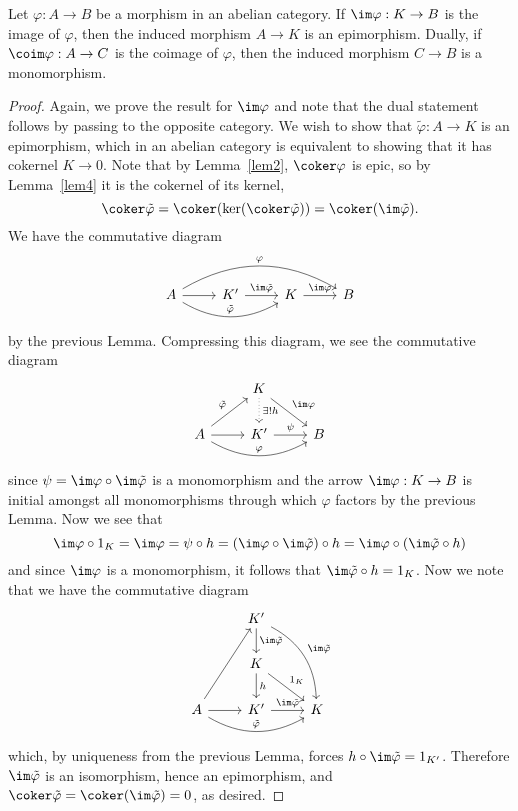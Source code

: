 \documentclass[10pt]{amsart}
\begin{document}
\begin{lem}\label{lem8}
  Let $\varphi : A \rightarrow B$ be a morphism in an abelian category.
  If $\im\varphi : K \rightarrow B$ is the image of $\varphi$, then the induced morphism $A \rightarrow K$ is an epimorphism.
  Dually, if $\coim\varphi : A \rightarrow C$ is the coimage of $\varphi$, then the induced morphism $C \rightarrow B$ is a monomorphism.

  \begin{proof}
    Again, we prove the result for $\im\varphi$ and note that the dual statement follows by passing to the opposite category.
    We wish to show that $\tilde{\varphi} : A \rightarrow K$ is an epimorphism, which in an abelian category is equivalent to showing that it has cokernel $K \rightarrow 0$.
    Note that by Lemma~\ref{lem2}, $\coker\varphi$ is epic, so by Lemma~\ref{lem4} it is the cokernel of its kernel,
    $$\coker\tilde{\varphi} = \coker(\ker(\coker\tilde{\varphi})) = \coker(\im\tilde{\varphi}).$$
    We have the commutative diagram 
    $$\begin{tikzcd}
      A \arrow[bend right]{rr}{\tilde{\varphi}} \arrow[bend left]{rrr}{\varphi}\arrow{r} & K^\prime \arrow{r}{\im\tilde{\varphi}}& K \arrow{r}{\im\varphi}& B
    \end{tikzcd}$$
    by the previous Lemma.
    Compressing this diagram, we see the commutative diagram
    $$\begin{tikzcd}
      & K \arrow{rd}{\im\varphi} \arrow[dotted]{d}{\exists !h}&\\
      A \arrow[bend right]{rr}{\varphi} \arrow{r} \arrow{ru}{\tilde{\varphi}} & K^\prime \arrow{r}{\psi}& B
    \end{tikzcd}$$
    since $\psi = \im\varphi \circ \im\tilde{\varphi}$ is a monomorphism and the arrow $\im\varphi : K \rightarrow B$ is initial amongst all monomorphisms through which $\varphi$ factors by the previous Lemma.
    Now we see that 
    $$\im\varphi \circ 1_K = \im\varphi = \psi \circ h = (\im\varphi \circ \im\tilde{\varphi}) \circ h = \im\varphi \circ (\im\tilde{\varphi} \circ h)$$
    and since $\im\varphi$ is a monomorphism, it follows that $\im\tilde{\varphi} \circ h = 1_K$.
    Now we note that we have the commutative diagram
    $$\begin{tikzcd}
      & K^\prime \arrow{d}{\im\tilde{\varphi}} \arrow[bend left]{rdd}{\im\tilde{\varphi}}&\\
      & K \arrow{d}{h} \arrow{rd}{1_K}& \\
      A \arrow{ruu}\arrow{r}\arrow[bend right]{rr}{\tilde{\varphi}} & K^\prime \arrow{r}{\im\tilde{\varphi}}& K
    \end{tikzcd}$$
    which, by uniqueness from the previous Lemma, forces $h \circ \im\tilde{\varphi} = 1_{K^\prime}$.
    Therefore $\im\tilde{\varphi}$ is an isomorphism, hence an epimorphism, and $\coker\tilde{\varphi} = \coker(\im\tilde{\varphi}) = 0$, as desired.
  \end{proof}
\end{lem}
\end{document}
